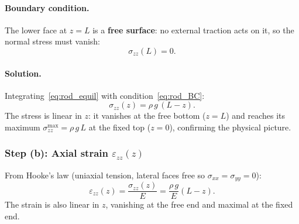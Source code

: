 \paragraph{Boundary condition.}
The lower face at $z=L$ is a \textbf{free surface}: no external traction acts on it, so the normal stress must vanish:
\begin{equation}
    \sigma_{zz}(L) = 0.
    \label{eq:rod_BC}
\end{equation}

\paragraph{Solution.}
Integrating~\eqref{eq:rod_equil} with condition~\eqref{eq:rod_BC}:
\begin{equation}
    \sigma_{zz}(z) = \rho\, g\,(L - z).
    \label{eq:rod_stress}
\end{equation}
The stress is linear in $z$: it vanishes at the free bottom ($z=L$) and reaches its maximum $\sigma_{zz}^{\max}=\rho\, g\, L$ at the fixed top ($z=0$), confirming the physical picture.

\begin{center}
\end{center}

\subsubsection*{Step (b): Axial strain $\varepsilon_{zz}(z)$}

From Hooke's law (uniaxial tension, lateral faces free so $\sigma_{xx}=\sigma_{yy}=0$):
\begin{equation}
    \varepsilon_{zz}(z) = \frac{\sigma_{zz}(z)}{E} = \frac{\rho\, g}{E}(L - z).
    \label{eq:rod_strain}
\end{equation}
The strain is also linear in $z$, vanishing at the free end and maximal at the fixed end.

